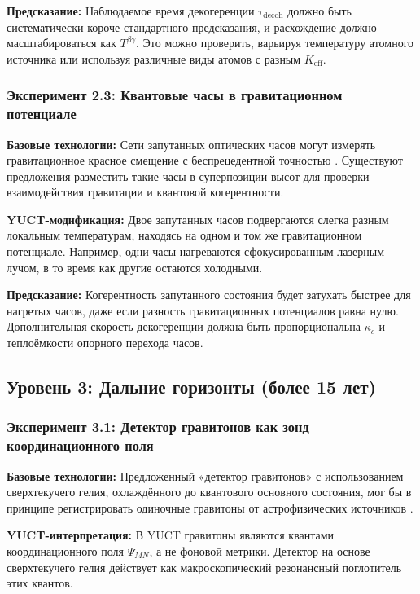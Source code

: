 \documentclass[12pt]{article}
\theoremstyle{remark}
\newcommand{\Keff}{K_{\mathrm{eff}}}
\begin{document}
	\textbf{Предсказание:} Наблюдаемое время декогеренции \(\tau_{\mathrm{decoh}}\) должно быть систематически короче стандартного предсказания, и расхождение должно масштабироваться как \(T^{\beta\gamma}\). Это можно проверить, варьируя температуру атомного источника или используя различные виды атомов с разным \(\Keff\).
	
	\subsubsection{Эксперимент 2.3: Квантовые часы в гравитационном потенциале}
	
	\textbf{Базовые технологии:} Сети запутанных оптических часов могут измерять гравитационное красное смещение с беспрецедентной точностью \cite{Katori2021}. Существуют предложения разместить такие часы в суперпозиции высот для проверки взаимодействия гравитации и квантовой когерентности.
	
	\textbf{YUCT-модификация:} Двое запутанных часов подвергаются слегка разным локальным температурам, находясь на одном и том же гравитационном потенциале. Например, одни часы нагреваются сфокусированным лазерным лучом, в то время как другие остаются холодными.
	
	\textbf{Предсказание:} Когерентность запутанного состояния будет затухать быстрее для нагретых часов, даже если разность гравитационных потенциалов равна нулю. Дополнительная скорость декогеренции должна быть пропорциональна \(\kappa_c\) и теплоёмкости опорного перехода часов.
	
	\subsection{Уровень 3: Дальние горизонты (более 15 лет)}
	\label{subsec:far-tests}
	
	\subsubsection{Эксперимент 3.1: Детектор гравитонов как зонд координационного поля}
	
	\textbf{Базовые технологии:} Предложенный «детектор гравитонов» с использованием сверхтекучего гелия, охлаждённого до квантового основного состояния, мог бы в принципе регистрировать одиночные гравитоны от астрофизических источников \cite{Berezin2025}.
	
	\textbf{YUCT-интерпретация:} В YUCT гравитоны являются квантами координационного поля \(\Psi_{MN}\), а не фоновой метрики. Детектор на основе сверхтекучего гелия действует как макроскопический резонансный поглотитель этих квантов.
	
\end{document}
